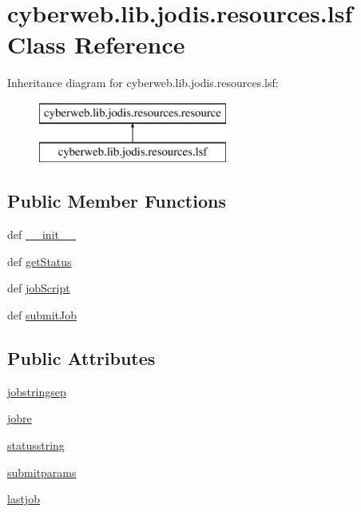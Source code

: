 \hypertarget{classcyberweb_1_1lib_1_1jodis_1_1resources_1_1lsf}{\section{cyberweb.\-lib.\-jodis.\-resources.\-lsf \-Class \-Reference}
\label{classcyberweb_1_1lib_1_1jodis_1_1resources_1_1lsf}
}
\-Inheritance diagram for cyberweb.\-lib.\-jodis.\-resources.\-lsf\-:\begin{figure}[H]
\begin{center}
\leavevmode
\includegraphics[height=2.000000cm]{classcyberweb_1_1lib_1_1jodis_1_1resources_1_1lsf}
\end{center}
\end{figure}
\subsection*{\-Public \-Member \-Functions}
\begin{DoxyCompactItemize}
\item 
def \hyperlink{classcyberweb_1_1lib_1_1jodis_1_1resources_1_1lsf_ab98d4a120e8559ca1ad3c3790b28892f}{\-\_\-\-\_\-init\-\_\-\-\_\-}
\item 
def \hyperlink{classcyberweb_1_1lib_1_1jodis_1_1resources_1_1lsf_a434ff596b6c3d0abe1d8e0bb0049b5fc}{get\-Status}
\item 
def \hyperlink{classcyberweb_1_1lib_1_1jodis_1_1resources_1_1lsf_ab3eaf2b1d21fec77a6a2ba27a02dd710}{job\-Script}
\item 
def \hyperlink{classcyberweb_1_1lib_1_1jodis_1_1resources_1_1lsf_a140082179ee71aae31887d76fb36aac7}{submit\-Job}
\end{DoxyCompactItemize}
\subsection*{\-Public \-Attributes}
\begin{DoxyCompactItemize}
\item 
\hyperlink{classcyberweb_1_1lib_1_1jodis_1_1resources_1_1lsf_a2337750bb5d58f615ccb38d06ffdef73}{jobstringsep}
\item 
\hyperlink{classcyberweb_1_1lib_1_1jodis_1_1resources_1_1lsf_a2cc11d96d8271ea9ae004413d8236b75}{jobre}
\item 
\hyperlink{classcyberweb_1_1lib_1_1jodis_1_1resources_1_1lsf_aa7b12f998dda655bee4be64f6f63b46d}{statusstring}
\item 
\hyperlink{classcyberweb_1_1lib_1_1jodis_1_1resources_1_1lsf_ad508a2d270b170f9537d1510204bebb4}{submitparams}
\item 
\hyperlink{classcyberweb_1_1lib_1_1jodis_1_1resources_1_1lsf_aaace6f6dfebc72dddbb22e3ab3e8627c}{lastjob}
\end{DoxyCompactItemize}


